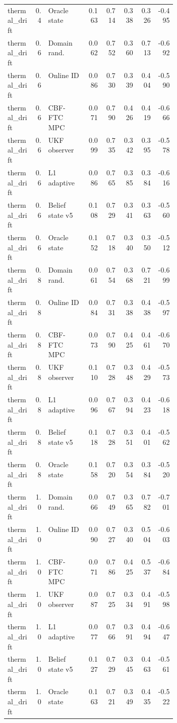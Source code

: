 \documentclass{article}
\begin{document}
\begin{center}
\begin{longtable}{p{0.16\linewidth}rp{0.23\linewidth}rrrrr}
thermal\_drift & 0.4 & Oracle state & 0.163 & 0.714 & 0.338 & 0.326 & -0.495\\
thermal\_drift & 0.6 & Domain rand. & 0.062 & 0.752 & 0.360 & 0.713 & -0.692\\
thermal\_drift & 0.6 & Online ID & 0.086 & 0.730 & 0.339 & 0.404 & -0.590\\
thermal\_drift & 0.6 & CBF-FTC MPC & 0.071 & 0.790 & 0.426 & 0.419 & -0.666\\
thermal\_drift & 0.6 & UKF observer & 0.099 & 0.735 & 0.342 & 0.395 & -0.578\\
thermal\_drift & 0.6 & L1 adaptive & 0.086 & 0.765 & 0.385 & 0.384 & -0.616\\
thermal\_drift & 0.6 & Belief state v5 & 0.108 & 0.729 & 0.341 & 0.363 & -0.560\\
thermal\_drift & 0.6 & Oracle state & 0.152 & 0.718 & 0.340 & 0.350 & -0.512\\
thermal\_drift & 0.8 & Domain rand. & 0.061 & 0.754 & 0.368 & 0.721 & -0.699\\
thermal\_drift & 0.8 & Online ID & 0.084 & 0.731 & 0.338 & 0.438 & -0.597\\
thermal\_drift & 0.8 & CBF-FTC MPC & 0.073 & 0.790 & 0.425 & 0.461 & -0.670\\
thermal\_drift & 0.8 & UKF observer & 0.110 & 0.728 & 0.348 & 0.429 & -0.573\\
thermal\_drift & 0.8 & L1 adaptive & 0.096 & 0.767 & 0.394 & 0.423 & -0.618\\
thermal\_drift & 0.8 & Belief state v5 & 0.118 & 0.728 & 0.351 & 0.401 & -0.562\\
thermal\_drift & 0.8 & Oracle state & 0.158 & 0.720 & 0.354 & 0.384 & -0.520\\
thermal\_drift & 1.0 & Domain rand. & 0.066 & 0.749 & 0.365 & 0.782 & -0.701\\
thermal\_drift & 1.0 & Online ID & 0.090 & 0.727 & 0.340 & 0.504 & -0.603\\
thermal\_drift & 1.0 & CBF-FTC MPC & 0.071 & 0.786 & 0.425 & 0.537 & -0.684\\
thermal\_drift & 1.0 & UKF observer & 0.087 & 0.725 & 0.334 & 0.491 & -0.598\\
thermal\_drift & 1.0 & L1 adaptive & 0.077 & 0.766 & 0.391 & 0.494 & -0.647\\
thermal\_drift & 1.0 & Belief state v5 & 0.127 & 0.729 & 0.345 & 0.463 & -0.561\\
thermal\_drift & 1.0 & Oracle state & 0.163 & 0.721 & 0.349 & 0.435 & -0.522\\

\end{longtable}
\end{center}
\end{document}
